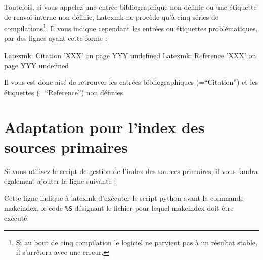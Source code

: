 Toutefois, si vous appelez une entrée bibliographique non définie ou une étiquette de renvoi interne non définie, Latexmk ne procède qu'à cinq séries de compilations\footnote{Si au bout de cinq compilation le logiciel ne parvient pas à un résultat stable, il s'arrêtera avec une erreur.}. Il vous indique cependant les entrées ou étiquettes problématiques, par des lignes ayant cette forme :
\begin{bashcode}
Latexmk: Citation 'XXX' on page YYY undefined 
Latexmk: Reference 'XXX' on page YYY undefined 
\end{bashcode}

Il vous est donc aisé de retrouver les entrées bibliographiques (=\enquote{Citation}) et les étiquettes (=\enquote{Reference}) non définies.

\section{Adaptation pour l'index des sources primaires}

Si vous utilisez le script de gestion de l'index des sources primaires, il vous faudra également ajouter la ligne suivante :

Cette ligne indique à latexmk d'exécuter le script python avant la commande makeindex, le code \verb|%S| désignant le fichier pour lequel makeindex doit être exécuté.
